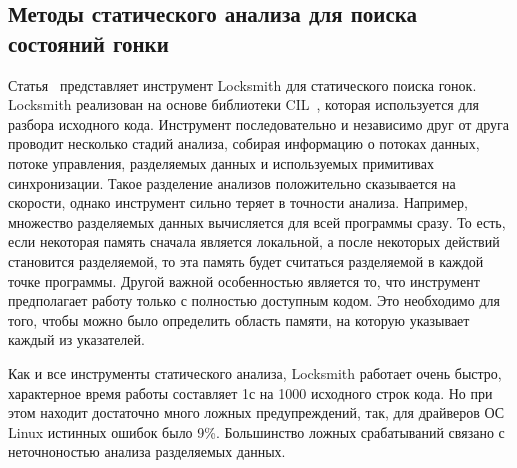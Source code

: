 \subsection{Методы статического анализа для поиска состояний гонки}

Статья~\cite{Pratikakis:2011} представляет инструмент Locksmith для статического поиска гонок.
Locksmith реализован на основе библиотеки CIL~\cite{CIL}, которая используется для разбора исходного кода.
Инструмент последовательно и независимо друг от друга проводит несколько стадий анализа, собирая информацию о потоках данных, потоке управления, разделяемых данных и используемых примитивах синхронизации.
Такое разделение анализов положительно сказывается на скорости, однако инструмент сильно теряет в точности анализа.
Например, множество разделяемых данных вычисляется для всей программы сразу. 
То есть, если некоторая память сначала является локальной, а после некоторых действий становится разделяемой, то эта память будет считаться разделяемой в каждой точке программы.
Другой важной особенностью является то, что инструмент предполагает работу только с полностью доступным кодом.
Это необходимо для того, чтобы можно было определить область памяти, на которую указывает каждый из указателей.

Как и все инструменты статического анализа, Locksmith работает очень быстро, характерное время работы составляет 1с на 1000 исходного строк кода.
Но при этом находит достаточно много ложных предупреждений, так, для драйверов ОС Linux истинных ошибок было 9\%.
Большинство ложных срабатываний связано с неточноностью анализа разделяемых данных.

